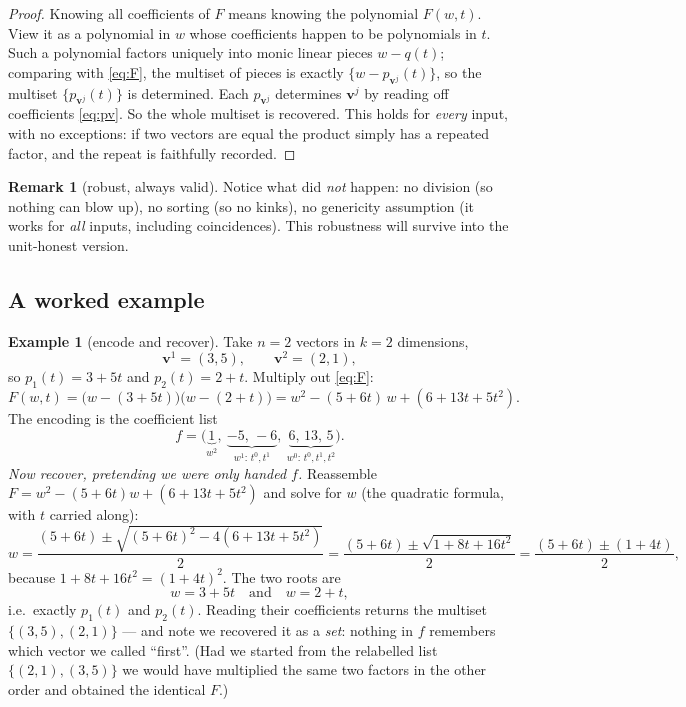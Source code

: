 \documentclass[11pt,a4paper]{article}
\theoremstyle{definition}
\newtheorem{example}[definition]{Example}
\newtheorem{remark}[definition]{Remark}
\theoremstyle{plain}
\newcommand{\bvec}[1]{\mathbf{#1}}
\begin{document}
\begin{proof}
Knowing all coefficients of $F$ means knowing the polynomial $F(w,t)$. View it as
a polynomial in $w$ whose coefficients happen to be polynomials in $t$. Such a
polynomial factors uniquely into monic linear pieces $w-q(t)$; comparing with
\eqref{eq:F}, the multiset of pieces is exactly $\{w-p_{\bvec v^j}(t)\}$, so the
multiset $\{p_{\bvec v^j}(t)\}$ is determined. Each $p_{\bvec v^j}$ determines
$\bvec v^j$ by reading off coefficients \eqref{eq:pv}. So the whole multiset is
recovered. This holds for \emph{every} input, with no exceptions: if two vectors
are equal the product simply has a repeated factor, and the repeat is faithfully
recorded.
\end{proof}

\begin{remark}[robust, always valid]\label{rmk:robust}
Notice what did \emph{not} happen: no division (so nothing can blow up), no
sorting (so no kinks), no genericity assumption (it works for \emph{all} inputs,
including coincidences). This robustness will survive into the unit-honest version.
\end{remark}

\subsection{A worked example}

\begin{example}[encode and recover]\label{ex:basic}
Take $n=2$ vectors in $k=2$ dimensions,
\[
   \bvec v^1=(3,5),\qquad \bvec v^2=(2,1),
\]
so $p_1(t)=3+5t$ and $p_2(t)=2+t$. Multiply out \eqref{eq:F}:
\[
   F(w,t)=\bigl(w-(3+5t)\bigr)\bigl(w-(2+t)\bigr)
         =w^2-(5+6t)\,w+(6+13t+5t^2).
\]
The encoding is the coefficient list
\[
   f=\bigl(\underbrace{1}_{w^2},\ \underbrace{-5,\,-6}_{w^1:\,t^0,t^1},\
            \underbrace{6,\,13,\,5}_{w^0:\,t^0,t^1,t^2}\bigr).
\]
\emph{Now recover, pretending we were only handed $f$.} Reassemble
$F=w^2-(5+6t)w+(6+13t+5t^2)$ and solve for $w$ (the quadratic formula, with $t$
carried along):
\[
   w=\frac{(5+6t)\pm\sqrt{(5+6t)^2-4(6+13t+5t^2)}}{2}
    =\frac{(5+6t)\pm\sqrt{1+8t+16t^2}}{2}
    =\frac{(5+6t)\pm(1+4t)}{2},
\]
because $1+8t+16t^2=(1+4t)^2$. The two roots are
\[
   w=3+5t\quad\text{and}\quad w=2+t,
\]
i.e.\ exactly $p_1(t)$ and $p_2(t)$. Reading their coefficients returns the
multiset $\{(3,5),(2,1)\}$ --- and note we recovered it as a \emph{set}: nothing in
$f$ remembers which vector we called ``first''. (Had we started from the relabelled
list $\{(2,1),(3,5)\}$ we would have multiplied the same two factors in the other
order and obtained the identical $F$.)
\end{example}
\end{document}
